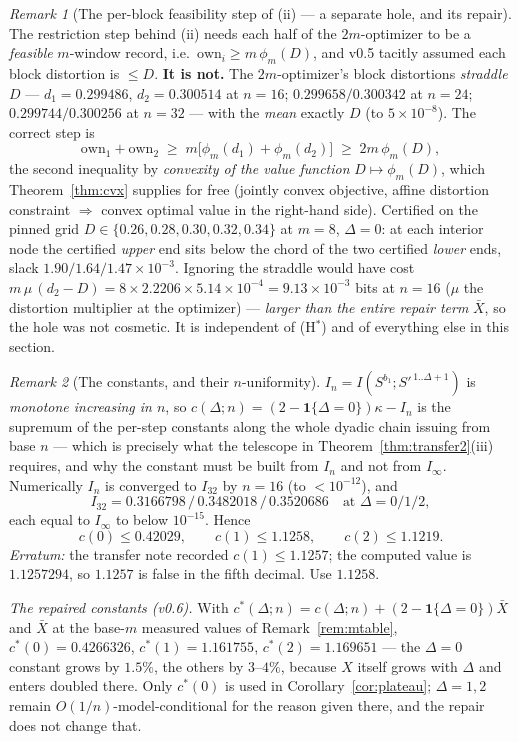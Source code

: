 \documentclass[11pt]{article}
\theoremstyle{definition}
\theoremstyle{remark}
\newtheorem{remark}{Remark}
\begin{document}
\begin{remark}[The per-block feasibility step of (ii) --- a separate
hole, and its repair]
\label{rem:feas}
The restriction step behind (ii) needs each half of the
$2m$-optimizer to be a \emph{feasible} $m$-window record, i.e.\
$\mathrm{own}_i\ge m\,\phi_m(D)$, and v0.5 tacitly assumed each block
distortion is $\le D$. \textbf{It is not.} The $2m$-optimizer's block
distortions \emph{straddle} $D$ --- $d_1=0.299486$, $d_2=0.300514$ at
$n=16$; $0.299658/0.300342$ at $n=24$; $0.299744/0.300256$ at $n=32$
--- with the \emph{mean} exactly $D$ (to $5\times10^{-8}$). The correct
step is
\[
\mathrm{own}_1+\mathrm{own}_2\;\ge\;
m\bigl[\phi_m(d_1)+\phi_m(d_2)\bigr]\;\ge\;2m\,\phi_m(D),
\]
the second inequality by \emph{convexity of the value function}
$D\mapsto\phi_m(D)$, which Theorem~\ref{thm:cvx} supplies for free
(jointly convex objective, affine distortion constraint $\Rightarrow$
convex optimal value in the right-hand side). Certified on the pinned
grid $D\in\{0.26,0.28,0.30,0.32,0.34\}$ at $m=8$, $\Delta=0$: at each
interior node the certified \emph{upper} end sits below the chord of
the two certified \emph{lower} ends, slack
$1.90/1.64/1.47\times10^{-3}$. Ignoring the straddle would have cost
$m\,\mu\,(d_2-D)=8\times2.2206\times5.14\times10^{-4}
=9.13\times10^{-3}$ bits at $n=16$ ($\mu$ the distortion multiplier at
the optimizer) --- \emph{larger than the entire repair term} $\bar X$,
so the hole was not cosmetic. It is independent of (H$^\ast$) and of
everything else in this section.
\end{remark}

\begin{remark}[The constants, and their $n$-uniformity]
\label{rem:const}
$I_n=I(S^{b_1};S'^{\,1..\Delta+1})$ is \emph{monotone increasing in
$n$}, so $c(\Delta;n)=(2-\mathbf 1\{\Delta=0\})\kappa-I_n$ is the
supremum of the per-step constants along the whole dyadic chain issuing
from base $n$ --- which is precisely what the telescope in
Theorem~\ref{thm:transfer2}(iii) requires, and why the constant must be
built from $I_n$ and not from $I_\infty$. Numerically $I_n$ is
converged to $I_{32}$ by $n=16$ (to $<10^{-12}$), and
\[
I_{32}=0.3166798\,/\,0.3482018\,/\,0.3520686
\quad\text{at }\Delta=0/1/2,
\]
each equal to $I_\infty$ to below $10^{-15}$. Hence
\[
c(0)\le0.42029,\qquad \boxed{c(1)\le1.1258},\qquad c(2)\le1.1219 .
\]
\emph{Erratum:} the transfer note recorded $c(1)\le1.1257$; the
computed value is $1.1257294$, so $1.1257$ is false in the fifth
decimal. Use $1.1258$.

\emph{The repaired constants (v0.6).} With
$c^\ast(\Delta;n)=c(\Delta;n)+(2-\mathbf 1\{\Delta=0\})\bar X$ and
$\bar X$ at the base-$m$ measured values of Remark~\ref{rem:mtable},
$c^\ast(0)=0.4266326$, $c^\ast(1)=1.161755$, $c^\ast(2)=1.169651$ ---
the $\Delta=0$ constant grows by $1.5\%$, the others by $3$--$4\%$,
because $X$ itself grows with $\Delta$ and enters doubled there. Only
$c^\ast(0)$ is used in Corollary~\ref{cor:plateau}; $\Delta=1,2$ remain
$O(1/n)$-model-conditional for the reason given there, and the repair
does not change that.
\end{remark}
\end{document}
